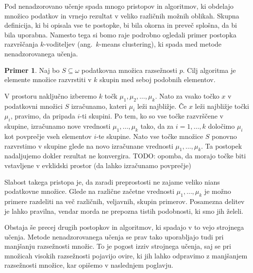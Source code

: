\documentclass[12pt,a4paper,twoside]{article}
\theoremstyle{definition} %
\newtheorem{primer}[definicija]{Primer}
\theoremstyle{plain} %
\numberwithin{equation}{section}  %
\begin{document}
Pod nenadzorovano učenje spada mnogo pristopov in algoritmov, ki obdelajo množico podatkov in vrnejo rezultat v veliko različnih možnih oblikah. 
Skupna definicija, ki bi opisala vse te postopke, bi bila okorna in preveč splošna, da bi bila uporabna. 
Namesto tega si bomo raje podrobno ogledali primer postopka razvrščanja $k$-voditeljev (ang.~$k$-means clustering), ki spada med metode nenadzorovanega učenja.

\begin{primer}
Naj bo $S \subseteq \omega$ podatkovna množica razsežnosti $p$. 
Cilj algoritma je elemente množice razvrstiti v $k$ skupin med seboj podobnih elementov.


V prostoru naključno izberemo $k$ točk $\mu_1, \mu_2, \ldots , \mu_k$. 
Nato za vsako točko $x$ v podatkovni množici $S$ izračunamo, kateri $\mu_i$ leži najbližje. Če $x$ leži najbližje točki $\mu_i$, pravimo, da pripada $i$-ti skupini. 
Po tem, ko so vse točke razvrščene v skupine, izračunamo nove vrednosti $\mu_1, \ldots , \mu_k$ tako, da za $i=1,\ldots,k$ določimo $\mu_i$ kot povprečje vseh elementov $i$-te skupine. 
Nato vse točke množice $S$ ponovno razvrstimo v skupine glede na novo izračunane vrednosti $\mu_1, \ldots, \mu_k$.
Ta postopek nadaljujemo dokler rezultat ne konvergira. 
TODO: opomba, da morajo točke biti vstavljene v evklidski prostor (da lahko izračunamo povprečje)

Slabost takega pristopa je, da zaradi preprostosti ne zajame veliko nians podatkovne množice. 
Glede na različne začetne vrednosti $\mu_1, \ldots, \mu_k$ je možno primere razdeliti na več različnih, veljavnih, skupin primerov. 
Posamezna delitev je lahko pravilna, vendar morda ne prepozna tistih podobnosti, ki smo jih želeli.
\end{primer}


Obstaja še precej drugih postopkov in algoritmov, ki spadajo v to vejo strojnega učenja. 
Metode nenadzorovanega učenja se prav tako uporabljajo tudi pri manjšanju razsežnosti množic. 
To je pogost izziv strojnega učenja, saj se pri množicah visokih razsežnosti pojavijo ovire, ki jih lahko odpravimo z manjšanjem razsežnosti množice, kar opišemo v naslednjem poglavju.
\end{document}
